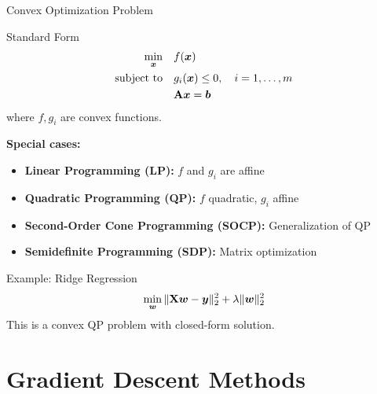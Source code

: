 \documentclass[aspectratio=169]{beamer}
\begin{document}
\begin{frame}{Convex Optimization Problem}
  \begin{definitionbox}{Standard Form}
    \begin{align*}
      \min_{\boldsymbol{x}} \quad & f(\boldsymbol{x}) \\
      \text{subject to} \quad & g_i(\boldsymbol{x}) \leq 0, \quad i = 1, \ldots, m \\
      & \mathbf{A}\boldsymbol{x} = \boldsymbol{b}
    \end{align*}
    where $f, g_i$ are convex functions.
  \end{definitionbox}

  \vspace{0.5em}

  \textbf{Special cases:}
  \begin{itemize}
    \item \textbf{Linear Programming (LP):} $f$ and $g_i$ are affine
    \item \textbf{Quadratic Programming (QP):} $f$ quadratic, $g_i$ affine
    \item \textbf{Second-Order Cone Programming (SOCP):} Generalization of QP
    \item \textbf{Semidefinite Programming (SDP):} Matrix optimization
  \end{itemize}

  \vspace{0.5em}

  \begin{examplebox}{Example: Ridge Regression}
    $$\min_{\boldsymbol{w}} \|\mathbf{X}\boldsymbol{w} - \boldsymbol{y}\|_2^2 + \lambda \|\boldsymbol{w}\|_2^2$$
    This is a convex QP problem with closed-form solution.
  \end{examplebox}
\end{frame}

\section{Gradient Descent Methods}
\end{document}
